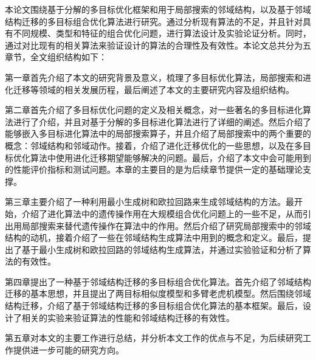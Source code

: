 本论文围绕基于分解的多目标优化框架和用于局部搜索的邻域结构，以及基于邻域结构迁移的多目标组合优化算法进行研究。通过分析现有算法的不足，并且针对具有不同规模、类型和特征的组合优化问题，进行算法设计及实验论证分析。同时，通过对比现有的相关算法来验证设计的算法的合理性及有效性。本论文总共分为五章节，全文组织结构如下：
\par
第一章首先介绍了本文的研究背景及意义，梳理了多目标优化算法，局部搜索和进化迁移等领域的相关发展历程，最后阐述了本文的主要研究内容及组织结构。
\par
第二章首先介绍了多目标优化问题的定义及相关概念，对一些著名的多目标进化算法进行了介绍，并且对基于分解的多目标进化算法进行了详细的阐述。然后介绍了能够嵌入多目标进化算法中的局部搜索算子，并且介绍了局部搜索中的两个重要的概念：邻域结构和邻域动作。接着，介绍了进化迁移优化的一些思想，以及在多目标优化算法中使用进化迁移期望能够解决的问题。最后，介绍了本文中会可能用到的性能评价指标和测试问题。本章的主要目的是为后续章节提供一定的基础理论支撑。
\par
第三章主要介绍了一种利用最小生成树和欧拉回路来生成邻域结构的方法。最开始，介绍了进化算法中的遗传操作用在大规模组合优化问题上的一些不足，从而引出用局部搜索来替代遗传操作在算法中的作用。然后介绍了研究局部搜索中的邻域结构的动机，接着介绍了一些在邻域结构生成算法中用到的概念和定义。最后，提出了基于最小生成树和欧拉回路的邻域结构生成算法，并通过实验验证和分析了算法的有效性。
\par
第四章提出了一种基于邻域结构迁移的多目标组合优化算法。首先介绍了邻域结构迁移的基本思想，并且提出了两目标相似度模型和多臂老虎机模型。然后围绕邻域结构迁移，介绍了基于邻域结构迁移的多目标组合优化算法的基本框架。最后，设计了相关的实验来验证算法的性能和邻域结构迁移的有效性。
\par
第五章对本文的主要工作进行总结，并分析本文工作的优点与不足，为后续研究工作提供进一步可能的研究方向。
